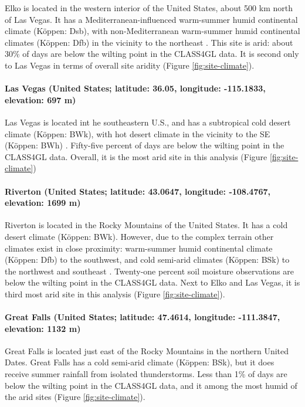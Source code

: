 Elko is located in the western interior of the United States, about
500 km north of Las Vegas. It has a Mediterranean-influenced
warm-summer humid continental climate (K\"{o}ppen: Dsb), with
non-Mediterranean warm-summer humid continental climates (K\"{o}ppen:
Dfb) in the vicinity to the northeast \cite{rubel2010}. This site is
arid: about 30\% of days are below the wilting point in the CLASS4GL
data. It is second only to Las Vegas in terms of overall site aridity
(Figure \ref{fig:site-climate}).

\paragraph{Las Vegas (United States; latitude: 36.05, longitude:
  -115.1833, elevation: 697 m)}

Las Vegas is located int he southeastern U.S., and has a subtropical
cold desert climate (K\"{o}ppen: BWk), with hot desert climate in the
vicinity to the SE (K\"{o}ppen: BWh) \cite{rubel2010}. Fifty-five
percent of days are below the wilting point in the CLASS4GL
data. Overall, it is the most arid site in this analysis (Figure
\ref{fig:site-climate})

\paragraph{Riverton (United States; latitude: 43.0647, longitude:
  -108.4767, elevation: 1699 m)}

Riverton is located in the Rocky Mountains of the United States. It
has a cold desert climate (K\"{o}ppen: BWk). However, due to the
complex terrain other climates exist in close proximity: warm-summer
humid continental climate (K\"{o}ppen: Dfb) to the southwest, and cold
semi-arid climates (K\"{o}ppen: BSk) to the northwest and southeast
\cite{rubel2010}. Twenty-one percent soil moisture observations are
below the wilting point in the CLASS4GL data. Next to Elko and Las
Vegas, it is third most arid site in this analysis (Figure
\ref{fig:site-climate}).

\paragraph{Great Falls (United States; latitude: 47.4614, longitude:
  -111.3847, elevation: 1132 m)}

Great Falls is located just east of the Rocky Mountains in the
northern United Dates. Great Falls has a cold semi-arid climate
(K\"{o}ppen: BSk), but it does receive summer rainfall from isolated
thunderstorms. Less than 1\% of days are below the wilting point in
the CLASS4GL data, and it among the most humid of the arid sites
(Figure \ref{fig:site-climate}).


